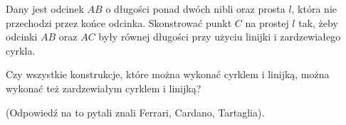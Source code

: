\begin{problem}
    Dany jest odcinek $AB$ o długości ponad dwóch nibli oraz prosta $l$, która nie przechodzi przez końce odcinka.
    Skonstrować punkt $C$ na prostej $l$ tak, żeby odcinki $AB$ oraz $AC$ były równej długości przy użyciu linijki i zardzewiałego cyrkla.
\end{problem}

\begin{problem}
    \label{broken_ruler_compass_hartshorne_end}
    Czy wszystkie konstrukcje, które można wykonać cyrklem i linijką, można wykonać też zardzewiałym cyrklem i linijką?
\end{problem}

(Odpowiedź na to pytali znali Ferrari, Cardano, Tartaglia).

%